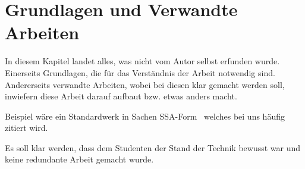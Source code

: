 \chapter{Grundlagen und Verwandte Arbeiten}\label{sec:basics}

In diesem Kapitel landet alles,
was nicht vom Autor selbst erfunden wurde.
Einerseits Grundlagen,
die für das Verständnis der Arbeit notwendig sind.
Andererseits verwandte Arbeiten,
wobei bei diesen klar gemacht werden soll,
inwiefern diese Arbeit darauf aufbaut bzw. etwas anders macht.

Beispiel wäre ein Standardwerk in Sachen SSA-Form~\cite{cytron91}
welches bei uns häufig zitiert wird.

Es soll klar werden,
dass dem Studenten der Stand der Technik bewusst war
und keine redundante Arbeit gemacht wurde.
